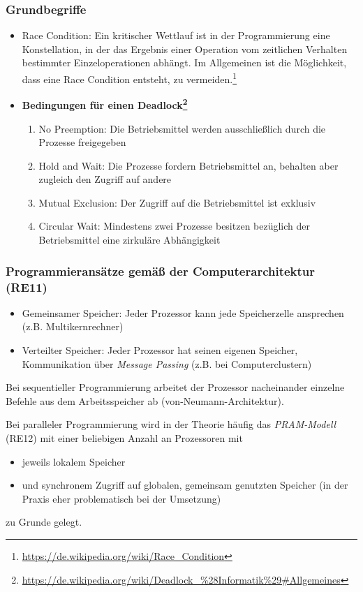 \subsubsection{Grundbegriffe}
\begin{itemize}
	\item Race Condition: Ein kritischer Wettlauf ist in der Programmierung eine Konstellation, in der das Ergebnis einer Operation vom zeitlichen Verhalten bestimmter Einzeloperationen abhängt. Im Allgemeinen ist die Möglichkeit, dass eine Race Condition entsteht, zu vermeiden.\footnote{\url{https://de.wikipedia.org/wiki/Race_Condition}}
	\item \textbf{Bedingungen für einen Deadlock\footnote{\url{https://de.wikipedia.org/wiki/Deadlock_\%28Informatik\%29\#Allgemeines}}}
	\begin{enumerate}
		\item No Preemption: Die Betriebsmittel werden ausschließlich durch die Prozesse freigegeben
		\item Hold and Wait: Die Prozesse fordern Betriebsmittel an, behalten aber zugleich den Zugriff auf andere
		\item Mutual Exclusion: Der Zugriff auf die Betriebsmittel ist exklusiv
		\item Circular Wait: Mindestens zwei Prozesse besitzen bezüglich der Betriebsmittel eine zirkuläre Abhängigkeit
	\end{enumerate}
\end{itemize}

\subsubsection{Programmieransätze gemäß der Computerarchitektur (RE11)}
\begin{itemize}
	\item Gemeinsamer Speicher: Jeder Prozessor kann jede Speicherzelle ansprechen (z.B. Multikernrechner)
	\item Verteilter Speicher: Jeder Prozessor hat seinen eigenen Speicher, Kommunikation über \textit{Message Passing} (z.B. bei Computerclustern)
\end{itemize}
Bei sequentieller Programmierung arbeitet der Prozessor nacheinander einzelne Befehle aus dem Arbeitsspeicher ab (von-Neumann-Architektur).

Bei paralleler Programmierung wird in der Theorie häufig das \textit{PRAM-Modell} (RE12) mit einer beliebigen Anzahl an Prozessoren mit
\begin{itemize}
	\item jeweils lokalem Speicher
	\item und synchronem Zugriff auf globalen, gemeinsam genutzten Speicher (in der Praxis eher problematisch bei der Umsetzung)
\end{itemize}
zu Grunde gelegt.

